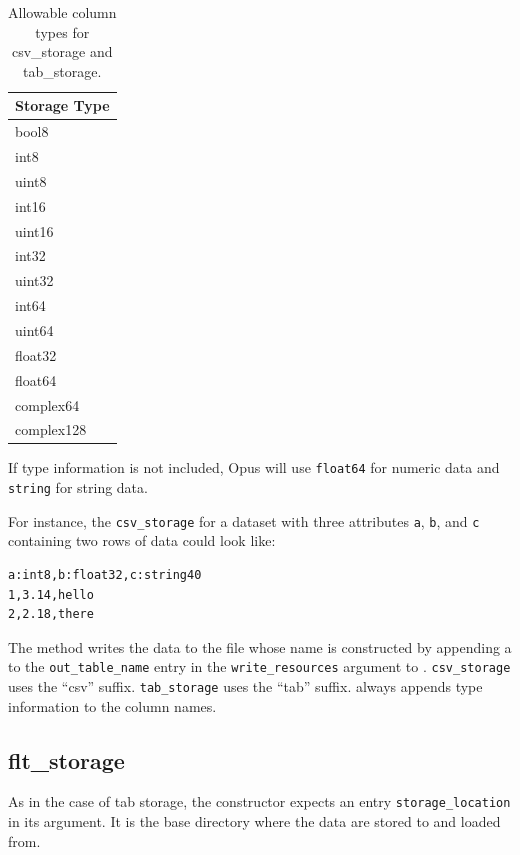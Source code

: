 {\begin{table}
\begin{center}
\begin{tabular}{|l|}\hline
Storage Type \\
\hline
bool8 \\
int8 \\
uint8 \\
int16 \\
uint16 \\
int32 \\
uint32 \\
int64 \\
uint64 \\
float32 \\
float64 \\
complex64 \\
complex128 \\
\hline
\end{tabular}
\end{center}
\caption{\label{storage-numpy-python-mapping}Allowable column types
for csv_storage and tab_storage.}
\end{table}

If type information is not included, Opus will use \verb|float64| for numeric data
and \verb|string| for string data.

For instance, the \verb|csv_storage| for a dataset with three attributes
\verb|a|, \verb|b|, and \verb|c| containing two rows of data could look like:

\begin{verbatim}
a:int8,b:float32,c:string40
1,3.14,hello
2,2.18,there
\end{verbatim}

The method  writes the data to the file whose name is
constructed by appending a to the \verb|out_table_name| entry in
the \verb|write_resources| argument to .
\verb|csv_storage| uses the ``csv'' suffix.  \verb|tab_storage| uses the
``tab'' suffix.   always appends type information to
the column names.

\subsection{flt_storage}
\label{sec:flt-storage}
%
As in the case of tab storage, the constructor expects an entry
\verb|storage_location| in its argument. It is the base
directory where the data are stored to and loaded from.

}
